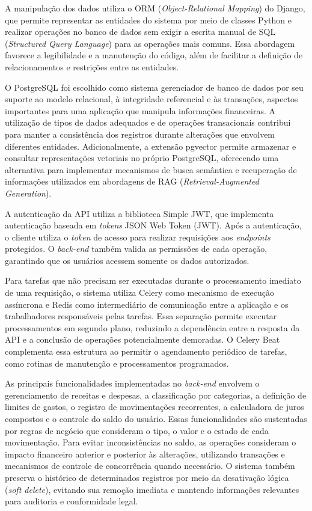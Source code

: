 \documentclass[12pt]{article}
\begin{document}
      A manipulação dos dados utiliza o ORM (\textit{Object-Relational Mapping}) do Django, que permite representar as entidades do sistema por meio de classes Python e realizar operações no banco de dados sem exigir a escrita manual de SQL (\textit{Structured Query Language}) para as operações mais comuns. Essa abordagem favorece a legibilidade e a manutenção do código, além de facilitar a definição de relacionamentos e restrições entre as entidades.

      O PostgreSQL foi escolhido como sistema gerenciador de banco de dados por seu suporte ao modelo relacional, à integridade referencial e às transações, aspectos importantes para uma aplicação que manipula informações financeiras. A utilização de tipos de dados adequados e de operações transacionais contribui para manter a consistência dos registros durante alterações que envolvem diferentes entidades. Adicionalmente, a extensão pgvector permite armazenar e consultar representações vetoriais no próprio PostgreSQL, oferecendo uma alternativa para implementar mecanismos de busca semântica e recuperação de informações utilizados em abordagens de RAG (\textit{Retrieval-Augmented Generation}).

      A autenticação da API utiliza a biblioteca Simple JWT, que implementa autenticação baseada em \textit{tokens} JSON Web Token (JWT). Após a autenticação, o cliente utiliza o \textit{token} de acesso para realizar requisições aos \textit{endpoints} protegidos. O \textit{back-end} também valida as permissões de cada operação, garantindo que os usuários acessem somente os dados autorizados.

      Para tarefas que não precisam ser executadas durante o processamento imediato de uma requisição, o sistema utiliza Celery como mecanismo de execução assíncrona e Redis como intermediário de comunicação entre a aplicação e os trabalhadores responsáveis pelas tarefas. Essa separação permite executar processamentos em segundo plano, reduzindo a dependência entre a resposta da API e a conclusão de operações potencialmente demoradas. O Celery Beat complementa essa estrutura ao permitir o agendamento periódico de tarefas, como rotinas de manutenção e processamentos programados.

      As principais funcionalidades implementadas no \textit{back-end} envolvem o gerenciamento de receitas e despesas, a classificação por categorias, a definição de limites de gastos, o registro de movimentações recorrentes, a calculadora de juros compostos e o controle do saldo do usuário. Essas funcionalidades são sustentadas por regras de negócio que consideram o tipo, o valor e o estado de cada movimentação. Para evitar inconsistências no saldo, as operações consideram o impacto financeiro anterior e posterior às alterações, utilizando transações e mecanismos de controle de concorrência quando necessário. O sistema também preserva o histórico de determinados registros por meio da desativação lógica (\textit{soft delete}), evitando sua remoção imediata e mantendo informações relevantes para auditoria e conformidade legal.
\end{document}
